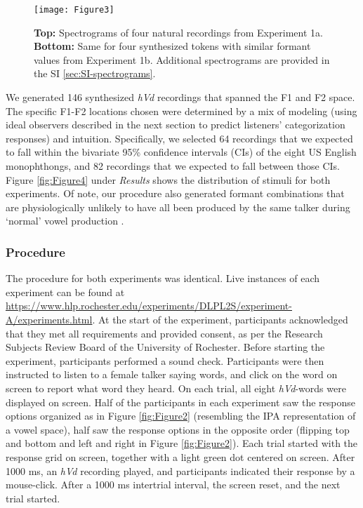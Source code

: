 \documentclass[preprint]{JASA}
\begin{document}
\begin{figure}

{\centering \texttt{[image: Figure3]} 

}

\caption{\textbf{Top:} Spectrograms of four natural recordings from Experiment 1a. \textbf{Bottom:} Same for four synthesized tokens with similar formant values from Experiment 1b. Additional spectrograms are provided in the SI \ref{sec:SI-spectrograms}.}\label{fig:Figure3}
\end{figure}

We generated 146 synthesized \emph{hVd} recordings that spanned the F1 and F2 space. The specific F1-F2 locations chosen were determined by a mix of modeling (using ideal observers described in the next section to predict listeners' categorization responses) and intuition. Specifically, we selected 64 recordings that we expected to fall within the bivariate 95\% confidence intervals (CIs) of the eight US English monophthongs, and 82 recordings that we expected to fall between those CIs. Figure \ref{fig:Figure4} under \emph{Results} shows the distribution of stimuli for both experiments. Of note, our procedure also generated formant combinations that are physiologically unlikely to have all been produced by the same talker during `normal' vowel production \citep[also known as ``off-template'' instances,][]{nearey1978}.

\subsubsection{Procedure}\label{sec:procedure}

The procedure for both experiments was identical. Live instances of each experiment can be found at \url{https://www.hlp.rochester.edu/experiments/DLPL2S/experiment-A/experiments.html}. At the start of the experiment, participants acknowledged that they met all requirements and provided consent, as per the Research Subjects Review Board of the University of Rochester. Before starting the experiment, participants performed a sound check. Participants were then instructed to listen to a female talker saying words, and click on the word on screen to report what word they heard. On each trial, all eight \emph{hVd}-words were displayed on screen. Half of the participants in each experiment saw the response options organized as in Figure \ref{fig:Figure2} (resembling the IPA representation of a vowel space), half saw the response options in the opposite order (flipping top and bottom and left and right in Figure \ref{fig:Figure2}). Each trial started with the response grid on screen, together with a light green dot centered on screen. After 1000 ms, an \emph{hVd} recording played, and participants indicated their response by a mouse-click. After a 1000 ms intertrial interval, the screen reset, and the next trial started.
\end{document}
